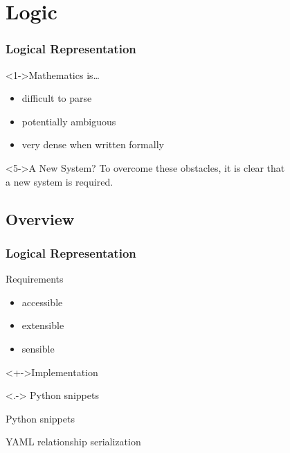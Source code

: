 \documentclass{beamer}
\begin{document}
\section{Logic}
\ifTOC\frame{\tableofcontents[currentsection]}\fi
\begin{frame}
  \frametitle{Logical Representation}
  \begin{block}<1->{Mathematics is\dots}
    \begin{itemize}
    \item<1-> difficult to parse
    \item<2-> potentially ambiguous
    \item<3-> very dense when written formally
    \end{itemize}
  \end{block}
  \begin{block}<5->{A New System?}
    To overcome these obstacles, it is clear that \\ a new system is required.
  \end{block}
\end{frame}

\subsection{Overview}
\begin{frame}
  \frametitle{Logical Representation}
  \begin{block}{Requirements}
    \begin{itemize}[<+->]
    \item accessible
    \item extensible
    \item sensible
    \end{itemize}
  \end{block}
  \begin{block}<+->{Implementation}
    \begin{description}[<+->]
    \item[predicates]<.-> Python snippets
    \item[moves] Python snippets
    \item[algorithms] \alert<+->{YAML} relationship serialization
    \end{description}
  \end{block}
\end{frame}
\end{document}
